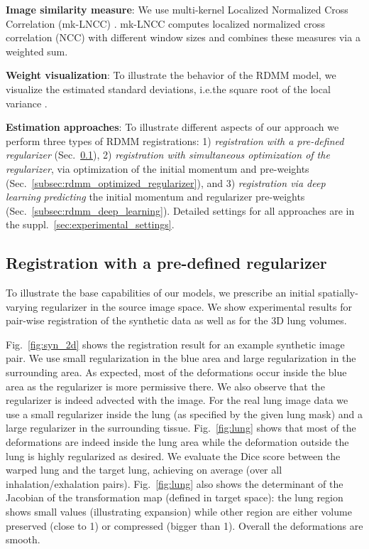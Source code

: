 \documentclass{article}
\numberwithin{equation}{section}
\newcommand{\ie}{{i.e.}}
\begin{document}
{\bf Image similarity measure}: We use multi-kernel Localized Normalized Cross Correlation (mk-LNCC) \cite{shen2019networks}. mk-LNCC computes localized normalized cross correlation (NCC) with different window sizes and combines these measures via a weighted sum.

{\bf Weight visualization}: To illustrate the behavior of the RDMM model, we visualize the estimated standard deviations, \ie the square root of the local variance .

{\bf Estimation approaches}: To illustrate different aspects of our approach we perform three types of RDMM registrations: 1) {\it registration with a pre-defined regularizer} (Sec.~\ref{subsec:rdmm_predefined}), 2) {\it registration with simultaneous optimization of the regularizer}, via optimization of the initial momentum and pre-weights (Sec.~\ref{subsec:rdmm_optimized_regularizer}), and 3) {\it registration via deep learning} \emph{predicting} the initial momentum and regularizer pre-weights (Sec.~\ref{subsec:rdmm_deep_learning}). Detailed settings for all approaches are in the suppl.~\ref{sec:experimental_settings}.




\subsection {Registration with a pre-defined regularizer}
\label{subsec:rdmm_predefined}

To illustrate the base capabilities of our models, we prescribe an initial spatially-varying regularizer in the source image space. We show experimental results for pair-wise registration of the synthetic data as well as for the 3D lung volumes.

Fig.~\ref{fig:syn_2d} shows the registration result for an example synthetic image pair. We use small regularization in the blue area and large regularization in the surrounding area. As expected, most of the deformations occur inside the blue area as the regularizer is more permissive there. We also observe that the regularizer is indeed advected with the image. For the real lung image data we use a small regularizer inside the lung (as specified by the given lung mask) and a large regularizer in the surrounding tissue. Fig.~\ref{fig:lung} shows that most of the deformations are indeed inside the lung area while the deformation outside the lung is highly regularized as desired. We evaluate the Dice score between the warped lung and the target lung, achieving  on average (over all inhalation/exhalation pairs). Fig.~\ref{fig:lung} also shows the determinant of the Jacobian of the transformation map  (defined in target space): the lung region shows small values (illustrating expansion) while other region are either volume preserved (close to 1) or compressed (bigger than 1). Overall the deformations are smooth.
\end{document}

